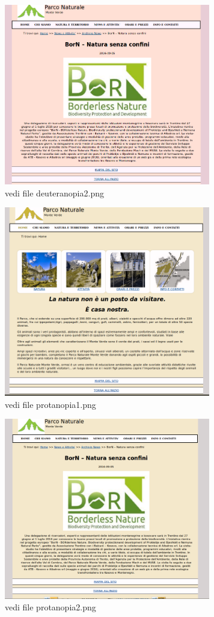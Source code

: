 \documentclass[12pt]{article}
\begin{document}
\begin{itemize}
			\begin{figure}
			\centering
			\includegraphics[width=90mm]{deuteranopia2}
			\caption{vedi file deuteranopia2.png}
			\end{figure}

			\begin{figure}
			\centering
			\includegraphics[width=90mm]{protanopia1}
			\caption{vedi file protanopia1.png}
			\end{figure}


			\begin{figure}
			\centering
			\includegraphics[width=90mm]{protanopia2}
			\caption{vedi file protanopia2.png}
			\end{figure}



\end{itemize}
\end{document}
